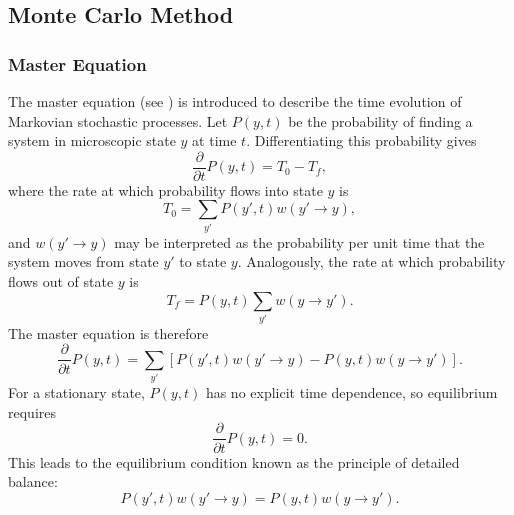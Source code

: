 \documentclass[a4paper]{article}
\begin{document}
\subsection{Monte Carlo Method}
\subsubsection{Master Equation}
The master equation (see \cite{Salinas}) is introduced to describe the time evolution of Markovian stochastic processes. Let $P(y,t)$ be the probability of finding a system in microscopic state $y$ at time $t$. Differentiating this probability gives
\begin{equation}
\frac{\partial}{\partial t}P(y,t)=T_0-T_f,
\end{equation}
where the rate at which probability flows into state $y$ is
\begin{equation}
T_0=\sum_{y'}P(y',t)w(y'\rightarrow y),
\end{equation}
and $w(y'\rightarrow y)$ may be interpreted as the probability per unit time that the system moves from state $y'$ to state $y$. Analogously, the rate at which probability flows out of state $y$ is
\begin{equation}
T_f=P(y,t)\sum_{y'}w(y\rightarrow y').
\end{equation}
The master equation is therefore
\begin{equation}\label{masterEq}
\frac{\partial}{\partial t}P(y,t)=\sum_{y'}\left[P(y',t)w(y'\rightarrow y)-P(y,t)w(y\rightarrow y')\right].
\end{equation}
For a stationary state, $P(y,t)$ has no explicit time dependence, so equilibrium requires
\begin{equation}
\frac{\partial}{\partial t}P(y,t)=0.
\end{equation}
This leads to the equilibrium condition known as the principle of detailed balance:
\begin{equation}\label{equi}
P(y',t)w(y'\rightarrow y)=P(y,t)w(y\rightarrow y').
\end{equation}
\end{document}

